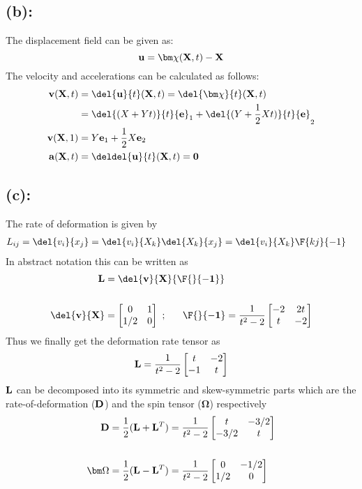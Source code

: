 \subsection*{(b):}
The displacement field can be given as: 
\[
{\bf u} = {\bm\chi}({\bf X},t) - {\bf X}
\]
The velocity and accelerations can be calculated as follows: 
\begin{align*}
{\bf v}({\bf X},t)
& = \del{{\bf u}}{t}({\bf X},t) 
= 
\del{\bm\chi}{t}({\bf X},t) \\
& = 
\del{(X+Yt)}{t}{\bf e}_1 
+ 
\del{(Y+\frac{1}{2}Xt)}{t}{\bf e}_2 \\
{\bf v}({\bf X},1)&  = 
Y{\bf e}_1
+ 
\frac{1}{2}X{\bf e}_2 \\
{\bf a}({\bf X},t)
& =
\deldel{{\bf u}}{t}({\bf X},t) = {\bf 0}
\end{align*}
\subsection*{(c):}
The rate of deformation is given by
\begin{align*}
L_{ij}
& =
\del{v_i}{x_j} = \del{v_i}{X_k}\del{X_k}{x_j} = \del{v_i}{X_k}\F{kj}{-1}
\end{align*} 
In abstract notation this can be written as
\begin{align*}
{\bf L} & = \del{\bf v}{\bf X}{\bf \F{}{-1}}\\ \\
\del{\bf v}{\bf X} & = \begin{bmatrix}
0 & 1\\
1/2 & 0 
\end{bmatrix}\ ; \ \ \ \ \ {\bf \F{}{-1}} = \frac{1}{t^2-2} \begin{bmatrix}
-2 & 2t \\
t & -2
\end{bmatrix}
\end{align*}
Thus we finally get the deformation rate tensor as 
\begin{align*}
{\bf L}
=
\frac{1}{t^2-2}
\begin{bmatrix}
t & -2\\
-1 & t
\end{bmatrix}
\end{align*}
$\bf L$ can be decomposed into its symmetric and skew-symmetric parts which are the rate-of-deformation ($\bf D$) and the spin tensor ($\bm\Omega$) respectively 
\begin{align*}
{\bf D} 
& = \frac{1}{2}({\bf L}+{\bf L}^T)
= \frac{1}{t^2-2}
\begin{bmatrix}
t & -3/2\\
-3/2 & t
\end{bmatrix}\\ \\
{\bm\Omega}
& = \frac{1}{2}({\bf L}-{\bf L}^T)
=
\frac{1}{t^2-2}
\begin{bmatrix}
0 & -1/2\\
1/2 & 0
\end{bmatrix}
\end{align*}
